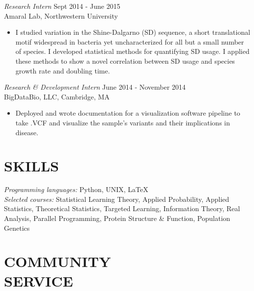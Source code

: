 \documentclass[margin, 10pt]{res} %
\begin{document}
\begin{resume}
{\sl Research Intern} \hfill Sept 2014 - June 2015 \\
Amaral Lab, Northwestern University
\begin{itemize}
\item[] I studied variation in the Shine-Dalgarno (SD) sequence, a short translational motif widespread in bacteria yet uncharacterized for all but a small number of species. I developed statistical methods for quantifying SD usage. I applied these methods to show a novel correlation between SD usage and species growth rate and doubling time.
\end{itemize} 

{\sl Research \& Development Intern} \hfill June 2014 - November 2014\\
BigDataBio, LLC, Cambridge, MA
\begin{itemize}
\item[] Deployed and wrote documentation for a visualization software pipeline to take .VCF and visualize the sample’s variants and their implications in disease.
\end{itemize} 


\section{SKILLS} 

{\sl Programming languages:} Python, UNIX, \LaTeX\\
{\sl Selected courses:} Statistical Learning Theory, Applied Probability, Applied Statistics, Theoretical Statistics, Targeted Learning, Information Theory, Real Analysis, Parallel Programming, Protein Structure \& Function, Population Genetics
 




\section{COMMUNITY \\ SERVICE}


\end{resume}
\end{document}
